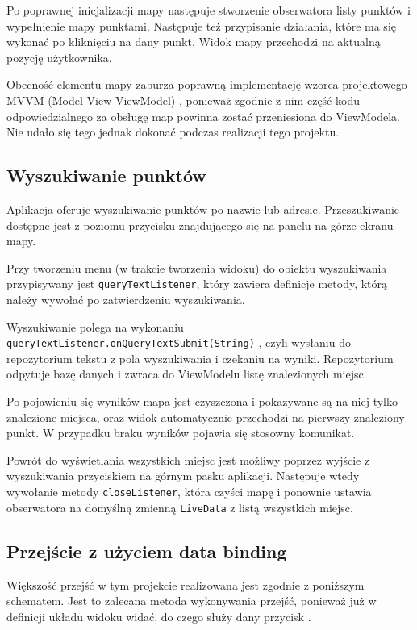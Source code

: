 \documentclass[polish,polish,a4paper,12pt]{article}
\begin{document}
	Po poprawnej inicjalizacji mapy następuje stworzenie obserwatora listy punktów i wypełnienie mapy punktami. Następuje też przypisanie działania, które ma się wykonać po kliknięciu na dany punkt. Widok mapy przechodzi na aktualną pozycję użytkownika.

	Obecność elementu mapy zaburza poprawną implementację wzorca projektowego MVVM (Model-View-ViewModel) \cite{mvvmwiki}, ponieważ zgodnie z nim część kodu odpowiedzialnego za obsługę map powinna zostać przeniesiona do ViewModela. Nie udało się tego jednak dokonać podczas realizacji tego projektu.

	\subsection{Wyszukiwanie punktów}

	Aplikacja oferuje wyszukiwanie punktów po nazwie lub adresie. Przeszukiwanie dostępne jest z poziomu przycisku znajdującego się na panelu na górze ekranu mapy.

	Przy tworzeniu menu (w trakcie tworzenia widoku) do obiektu wyszukiwania przypisywany jest \texttt{queryTextListener}, który zawiera definicje metody, którą należy wywołać po zatwierdzeniu wyszukiwania.

	Wyszukiwanie polega na wykonaniu \texttt{queryTextListener.onQueryTextSubmit(String)} \cite{androidapi}, czyli wysłaniu do repozytorium tekstu z pola wyszukiwania i czekaniu na wyniki. Repozytorium odpytuje bazę danych i zwraca do ViewModelu listę znalezionych miejsc.

	Po pojawieniu się wyników mapa jest czyszczona i pokazywane są na niej tylko znalezione miejsca, oraz widok automatycznie przechodzi na pierwszy znaleziony punkt. W przypadku braku wyników pojawia się stosowny komunikat.

	Powrót do wyświetlania wszystkich miejsc jest możliwy poprzez wyjście z wyszukiwania przyciskiem na górnym pasku aplikacji. Następuje wtedy wywołanie metody \texttt{closeListener}, która czyści mapę i ponownie ustawia obserwatora na domyślną zmienną \texttt{LiveData} z listą wszystkich miejsc.

	\subsection{Przejście z użyciem data binding}\label{navigation}

	Większość przejść w tym projekcie realizowana jest zgodnie z poniższym schematem. Jest to zalecana metoda wykonywania przejść, ponieważ już w definicji układu widoku widać, do czego służy dany przycisk \cite{kotlin}.
\end{document}
